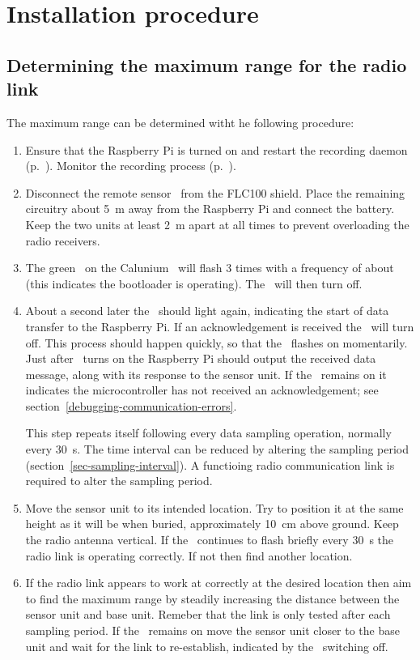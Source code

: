 \chapter{Installation procedure}

\section{Determining the maximum range for the radio link}

The maximum range can be determined witht he following procedure:
\begin{enumerate}
\item Ensure that the Raspberry Pi is turned on and restart the
  recording daemon (p.~\pageref{awnetd-restart}). Monitor the recording
  process (p.~\pageref{monitor-daemon-output}).
\item Disconnect the remote sensor \pcb\ from the FLC100 shield. Place
  the remaining circuitry about \SI{5}{\metre} away from the Raspberry
  Pi and connect the battery. Keep the two units at least
  \SI{2}{\metre} apart at all times to prevent overloading the radio
  receivers.
\item The green \led\ on the Calunium \pcb\ will flash 3 times with a
  frequency of about  (this indicates the bootloader is
  operating). The \led\ will then turn off. 
\item \label{item-led-flash} About a second later the \led\ should
  light again, indicating the start of data transfer to the Raspberry
  Pi. If an acknowledgement is received the \led\ will turn off. This
  process should happen quickly, so that the \led\ flashes on
  momentarily. Just after \led\ turns on the Raspberry Pi should
  output the received data message, along with its response to the
  sensor unit. If the \led\ remains on it indicates the
  microcontroller has not received an acknowledgement; see
  section~\ref{debugging-communication-errors}. 
  
  This step repeats itself following every data sampling operation,
  normally every \SI{30}{\second}. The time interval can be reduced by
  altering the sampling period
  (section~\ref{sec-sampling-interval}). A functioing radio
  communication link is required to alter the sampling period.
\item Move the sensor unit to its intended location. Try to position
  it at the same height as it will be when buried, approximately
  \SI{10}{\centi\metre} above ground. Keep the radio antenna
  vertical. If the \led\ continues to flash briefly every
  \SI{30}{\second} the radio link is operating correctly. If not then
  find another location.
\item If the radio link appears to work at correctly at the desired
  location then aim to find the maximum range by steadily increasing
  the distance between the sensor unit and base unit. Remeber that the
  link is only tested after each sampling period. If the \led\ remains
  on move the sensor unit closer to the base unit and wait for the
  link to re-establish, indicated by the \led\ switching off.
\end{enumerate}

